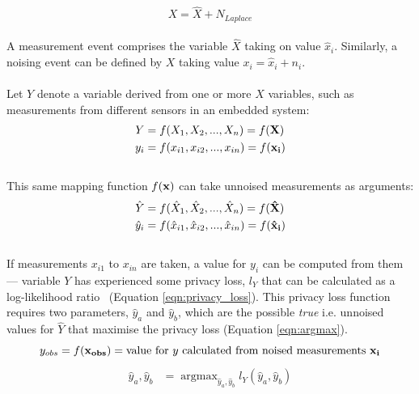 \documentclass[12pt]{article}
\DeclareMathOperator*{\argmax}{argmax}
\begin{document}
\begin{appendix}
    \begin{equation}
      X = \hat{X} + N_{Laplace}
    \end{equation}
    \\
    A measurement event comprises the variable $\hat{X}$ taking on value $\hat{x}_i$. Similarly, a noising event can be defined by $X$ taking value $x_i = \hat{x}_i + n_i$.
    \\
    \\
    Let $Y$ denote a variable derived from one or more $X$ variables, such as measurements from different sensors in an embedded system:
    \begin{align*}
      Y & = f(X_1, X_2, ..., X_n) = f(\bf{X})\\
      y_i & = f(x_{i1}, x_{i2}, ..., x_{in}) = f(\bf{x_i})
    \end{align*}
    \\
    This same mapping function $f(\bf{x})$ can take unnoised measurements as arguments:
    \begin{align*}
      \hat{Y} & = f(\hat{X}_1, \hat{X}_2, ..., \hat{X}_n) = f(\bf{\hat{X}})\\
      \hat{y}_i & = f(\hat{x}_{i1}, \hat{x}_{i2}, ..., \hat{x}_{in}) = f(\bf{\hat{x}_i})
    \end{align*}
    \\
    If measurements $x_{i1}$ to $x_{in}$ are taken, a value for $y_i$ can be computed from them --- variable $Y$ has experienced some privacy loss, $l_Y$ that can be calculated as a log-likelihood ratio~\cite{Choi2018GuaranteeingLD} (Equation \ref{eqn:privacy_loss}). This privacy loss function requires two parameters,  $\hat{y}_a$ and $\hat{y}_b$, which are the possible \textit{true} i.e. unnoised values for $\hat{Y}$ that maximise the privacy loss (Equation \ref{eqn:argmax}).
    \begin{equation}
      y_{obs} = f(\bf{x}_{obs}) = \text{value for $y$ calculated from noised measurements $\bf{x}_i$} \nonumber\\
    \end{equation}
    \begin{align}
      \hat{y}_a, \hat{y}_b & = \argmax_{\hat{y}_a, \hat{y}_b} l_Y(\hat{y}_a, \hat{y}_b) \label{eqn:argmax}\\

\end{align}
\end{appendix}
\end{document}
